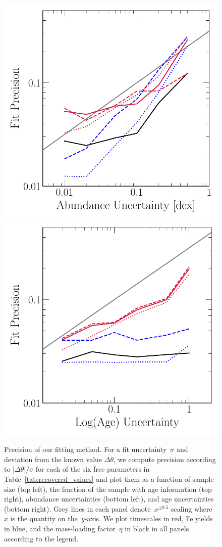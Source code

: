 \documentclass[foo.tex]{subfiles}
\begin{document}
\begin{figure}
\includegraphics[scale = 0.55]{precision_abundanceuncertainty.pdf}
\includegraphics[scale = 0.55]{precision_ageuncertainty.pdf}
\caption{
Precision of our fitting method.
For a fit uncertainty~$\sigma$ and deviation from the known value
$\Delta\theta$, we compute precision according to
$\left|\Delta\theta\right| / \sigma$ for each of the six free parameters
in Table~\ref{tab:recovered_values} and plot them as a function
of sample size (top left), the fraction of the sample with age information (top
right), abundance uncertainties (bottom left), and age uncertainties (bottom
right).
Grey lines in each panel denote~$x^{\pm0.5}$ scaling where~$x$ is the quantity
on the~$y$-axis.
We plot timescales in red, Fe yields in blue, and the mass-loading
factor~$\eta$ in black in all panels according to the legend.
}
\label{fig:precision}
\end{figure}
\end{document}
